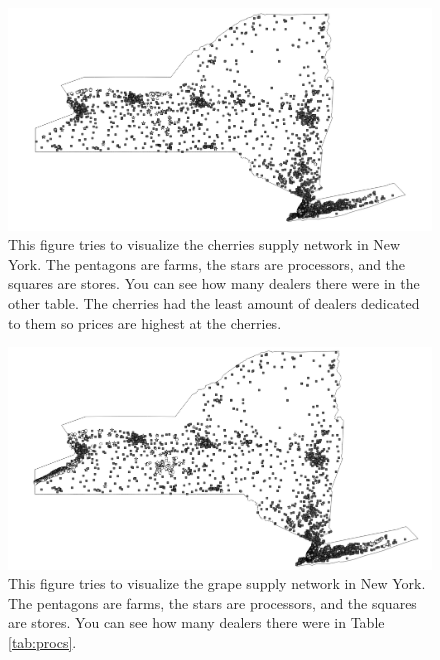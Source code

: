 \documentclass{report}
\begin{document}
\begin{figure}
\centering
\begin{framed}
\includegraphics[scale=.50]{network_66}
\caption{This figure tries to visualize the cherries supply network in New York. The pentagons are farms, the stars are processors, and the squares are stores. You can see how many dealers there were in the other table. The cherries had the least amount of dealers dedicated to them so prices are highest at the cherries. }
\label{fig:network_66}
\end{framed}
\end{figure}

\begin{figure}
\centering
\begin{framed}
\includegraphics[scale=.50]{network_69}
\caption{This figure tries to visualize the grape supply network in New York. The pentagons are farms, the stars are processors, and the squares are stores. You can see how many dealers there were in Table \ref{tab:procs}. }
\label{fig:network_69}
\end{framed}
\end{figure}
\end{document}
